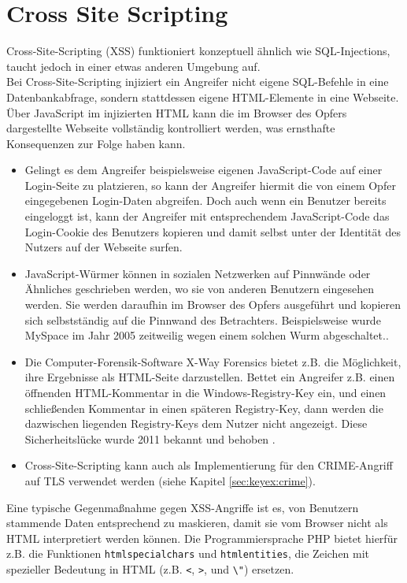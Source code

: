 \section{Cross Site Scripting}

Cross-Site-Scripting (XSS) funktioniert konzeptuell ähnlich wie SQL-Injections, taucht jedoch in einer etwas anderen Umgebung auf.\\

Bei Cross-Site-Scripting injiziert ein Angreifer nicht eigene SQL-Befehle in eine Datenbankabfrage,
sondern stattdessen eigene HTML-Elemente in eine Webseite.
Über JavaScript im injizierten HTML kann die im Browser des Opfers dargestellte Webseite vollständig kontrolliert werden, was
ernsthafte Konsequenzen zur Folge haben kann.
\begin{itemize}
	\item Gelingt es dem Angreifer beispielsweise eigenen JavaScript-Code auf einer Login-Seite zu platzieren, so kann der Angreifer hiermit die von einem Opfer eingegebenen Login-Daten abgreifen.
Doch auch wenn ein Benutzer bereits eingeloggt ist, kann der Angreifer mit entsprechendem JavaScript-Code das Login-Cookie des Benutzers kopieren und damit selbst unter der Identität des Nutzers auf der Webseite surfen.
	\item JavaScript-Würmer können in sozialen Netzwerken auf Pinnwände oder Ähnliches geschrieben werden, wo sie von anderen Benutzern eingesehen werden. Sie werden daraufhin im Browser des Opfers ausgeführt und kopieren sich selbstständig auf die Pinnwand des Betrachters.
Beispielsweise wurde MySpace im Jahr 2005 zeitweilig wegen einem solchen Wurm abgeschaltet.\cite{Kamkar2005, Sophos}.
	\item Die Computer-Forensik-Software X-Way Forensics bietet z.B. die Möglichkeit, ihre Ergebnisse als HTML-Seite darzustellen.
Bettet ein Angreifer z.B. einen öffnenden HTML-Kommentar in die Windows-Registry-Key ein, und einen schließenden Kommentar in einen späteren Registry-Key, dann werden die dazwischen liegenden Registry-Keys dem Nutzer nicht angezeigt.
Diese Sicherheitslücke wurde 2011 bekannt und behoben \cite{Wundram2011}.
	\item Cross-Site-Scripting kann auch als Implementierung für den CRIME-Angriff auf TLS verwendet werden (siehe Kapitel \ref{sec:keyex:crime}).
\end{itemize}

Eine typische Gegenmaßnahme gegen XSS-Angriffe ist es, von Benutzern stammende Daten entsprechend zu maskieren, damit sie vom Browser nicht als HTML interpretiert werden können.
Die Programmiersprache PHP bietet hierfür z.B. die Funktionen \lstinline+htmlspecialchars+ und \lstinline+htmlentities+, die Zeichen mit spezieller Bedeutung in HTML (z.B. \lstinline+<+, \lstinline+>+, und \lstinline+\"+) ersetzen.

